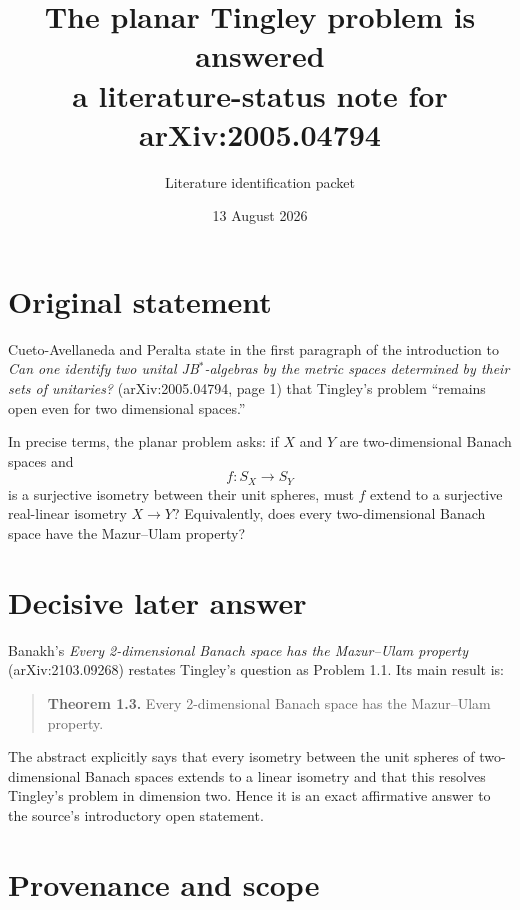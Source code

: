 \documentclass[10pt]{article}
\title{The planar Tingley problem is answered\\
a literature-status note for arXiv:2005.04794}
\author{Literature identification packet}
\date{13 August 2026}
\begin{document}
\maketitle

\begin{center}
\end{center}

\section*{Original statement}

Cueto-Avellaneda and Peralta state in the first paragraph of the introduction
to \emph{Can one identify two unital JB$^*$-algebras by the metric spaces
determined by their sets of unitaries?} (arXiv:2005.04794, page 1) that
Tingley's problem ``remains open even for two dimensional spaces.''

In precise terms, the planar problem asks: if $X$ and $Y$ are two-dimensional
Banach spaces and
\[
 f:S_X\longrightarrow S_Y
\]
is a surjective isometry between their unit spheres, must $f$ extend to a
surjective real-linear isometry $X\to Y$?  Equivalently, does every
two-dimensional Banach space have the Mazur--Ulam property?

\section*{Decisive later answer}

Banakh's \emph{Every 2-dimensional Banach space has the Mazur--Ulam property}
(arXiv:2103.09268) restates Tingley's question as Problem 1.1.  Its main result
is:
\begin{quote}
\textbf{Theorem 1.3.} Every 2-dimensional Banach space has the Mazur--Ulam
property.
\end{quote}
The abstract explicitly says that every isometry between the unit spheres of
two-dimensional Banach spaces extends to a linear isometry and that this
resolves Tingley's problem in dimension two.  Hence it is an exact affirmative
answer to the source's introductory open statement.

\section*{Provenance and scope}
\end{document}
